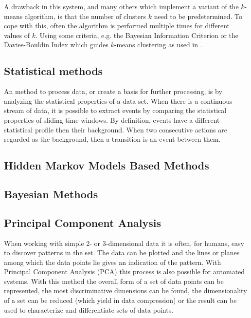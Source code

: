 A drawback in this system, and many others which implement a variant of the 
$k$-means algorithm, is that the number of clusters $k$ need to be 
predetermined. To cope with this, often the algorithm is performed multiple 
times for different values of $k$. Using some criteria, e.g. the Bayesian 
Information Criterion \cite{pelleg2000x} or the Davies-Bouldin Index which 
guides $k$-means clustering as used in \cite{krause2003unsupervised}.

\subsection{Statistical methods}
An method to process data, or create a basis for further processing, is by 
analyzing the statistical properties of a data set. When there is a continuous 
stream of data, it is possible to extract events by comparing the statistical 
properties of sliding time windows. By definition, events have a different 
statistical profile then their background. When two consecutive actions are 
regarded as the background, then a transition is an event between them. 

\subsection{Hidden Markov Models Based Methods}

\subsection{Bayesian Methods}

\subsection{Principal Component Analysis}
When working with simple 2- or 3-dimensional data it is often, for humans, 
easy to discover patterns in the set. The data can be plotted and the lines or 
planes among which the data points lie gives an indication of the pattern. 
With Principal Component Analysis (PCA) this process is also possible for 
automated systems. With this method the overall form of a set of data points 
can be represented, the most discriminative dimensions can be found, the 
dimensionality of a set can be reduced (which yield in data compression) or 
the result can be used to characterize and differentiate sets of data points.

